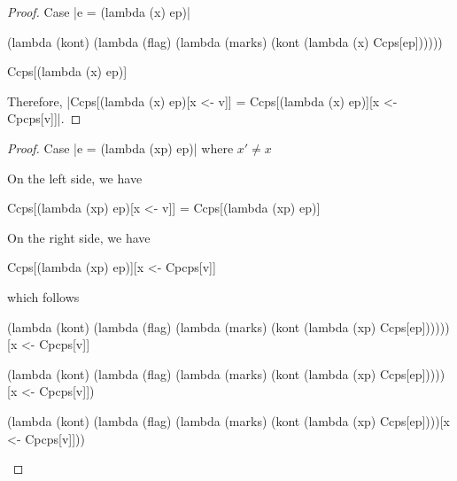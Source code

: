 \begin{proof}{Case \scheme|e = (lambda (x) ep)|}
\begin{schemeblock}
\begin{schemedisplay}
(lambda (kont)
  (lambda (flag)
    (lambda (marks)
      (kont (lambda (x) Ccps[ep])))))
\end{schemedisplay}
\end{schemeblock}

\begin{schemeblock}
\begin{schemedisplay}
Ccps[(lambda (x) ep)]
\end{schemedisplay}
\end{schemeblock}

Therefore, \scheme|Ccps[(lambda (x) ep)[x <- v]] = Ccps[(lambda (x) ep)][x <- Cpcps[v]]|.
\end{proof}

\begin{proof}{Case \scheme|e = (lambda (xp) ep)| where $x'\ne x$}

On the left side, we have
\begin{schemeblock}
\begin{schemedisplay}
Ccps[(lambda (xp) ep)[x <- v]] = Ccps[(lambda (xp) ep)]
\end{schemedisplay}
\end{schemeblock}

On the right side, we have
\begin{schemeblock}
\begin{schemedisplay}
Ccps[(lambda (xp) ep)][x <- Cpcps[v]]
\end{schemedisplay}
\end{schemeblock}
which follows
\begin{schemeblock}
\begin{schemedisplay}
(lambda (kont)
  (lambda (flag)
    (lambda (marks)
      (kont (lambda (xp) Ccps[ep])))))[x <- Cpcps[v]]
\end{schemedisplay}
\end{schemeblock}

\begin{schemeblock}
\begin{schemedisplay}
(lambda (kont)
  (lambda (flag)
    (lambda (marks)
      (kont (lambda (xp) Ccps[ep]))))[x <- Cpcps[v]])
\end{schemedisplay}
\end{schemeblock}

\begin{schemeblock}
\begin{schemedisplay}
(lambda (kont)
  (lambda (flag)
    (lambda (marks)
      (kont (lambda (xp) Ccps[ep])))[x <- Cpcps[v]]))
\end{schemedisplay}
\end{schemeblock}


\end{proof}
